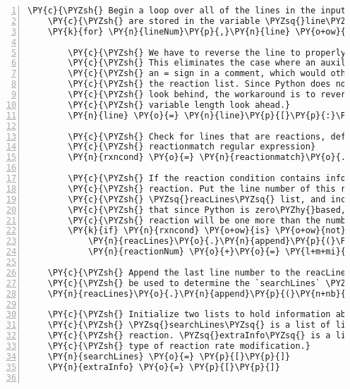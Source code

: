 \begin{Verbatim}[commandchars=\\\{\},fontsize=\small,numbers=left,firstnumber=1,stepnumber=2,firstline=2]
    \PY{c}{\PYZsh{} Begin a loop over all of the lines in the input file. The lines}
    \PY{c}{\PYZsh{} are stored in the variable \PYZsq{}line\PYZsq{} for each iteration.}
    \PY{k}{for} \PY{n}{lineNum}\PY{p}{,}\PY{n}{line} \PY{o+ow}{in} \PY{n+nb}{enumerate}\PY{p}{(}\PY{n}{lines}\PY{p}{)}\PY{p}{:}

        \PY{c}{\PYZsh{} We have to reverse the line to properly check for a reaction.}
        \PY{c}{\PYZsh{} This eliminates the case where an auxiliary line may contain}
        \PY{c}{\PYZsh{} an = sign in a comment, which would otherwise be included in}
        \PY{c}{\PYZsh{} the reaction list. Since Python does not allow variable length}
        \PY{c}{\PYZsh{} look behind, the workaround is to reverse the string and use}
        \PY{c}{\PYZsh{} variable length look ahead.}
        \PY{n}{line} \PY{o}{=} \PY{n}{line}\PY{p}{[}\PY{p}{:}\PY{p}{:}\PY{o}{\PYZhy{}}\PY{l+m+mi}{1}\PY{p}{]}

        \PY{c}{\PYZsh{} Check for lines that are reactions, defined by the}
        \PY{c}{\PYZsh{} reactionmatch regular expression}
        \PY{n}{rxncond} \PY{o}{=} \PY{n}{reactionmatch}\PY{o}{.}\PY{n}{search}\PY{p}{(}\PY{n}{line}\PY{p}{)}

        \PY{c}{\PYZsh{} If the reaction condition contains information the line is a}
        \PY{c}{\PYZsh{} reaction. Put the line number of this reaction in the}
        \PY{c}{\PYZsh{} \PYZsq{}reacLines\PYZsq{} list, and increment the reaction counter. Remember}
        \PY{c}{\PYZsh{} that since Python is zero\PYZhy{}based, the real reaction number of a}
        \PY{c}{\PYZsh{} reaction will be one more than the number from this loop}
        \PY{k}{if} \PY{n}{rxncond} \PY{o+ow}{is} \PY{o+ow}{not} \PY{n+nb+bp}{None}\PY{p}{:}
            \PY{n}{reacLines}\PY{o}{.}\PY{n}{append}\PY{p}{(}\PY{n}{lineNum}\PY{p}{)}
            \PY{n}{reactionNum} \PY{o}{+}\PY{o}{=} \PY{l+m+mi}{1}

    \PY{c}{\PYZsh{} Append the last line number to the reacLines list so that it can}
    \PY{c}{\PYZsh{} be used to determine the `searchLines` \PYZhy{} see below.}
    \PY{n}{reacLines}\PY{o}{.}\PY{n}{append}\PY{p}{(}\PY{n+nb}{len}\PY{p}{(}\PY{n}{lines}\PY{p}{)}\PY{p}{)}

    \PY{c}{\PYZsh{} Initialize two lists to hold information about the reactions.}
    \PY{c}{\PYZsh{} \PYZsq{}searchLines\PYZsq{} is a list of lists of the line numbers between each}
    \PY{c}{\PYZsh{} reaction. \PYZsq{}extraInfo\PYZsq{} is a list of integers corresponding to each}
    \PY{c}{\PYZsh{} type of reaction rate modification.}
    \PY{n}{searchLines} \PY{o}{=} \PY{p}{[}\PY{p}{]}
    \PY{n}{extraInfo} \PY{o}{=} \PY{p}{[}\PY{p}{]}


\end{Verbatim}
